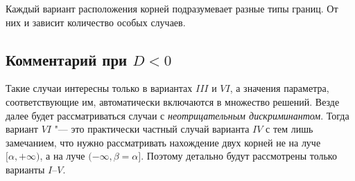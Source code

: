 Каждый вариант расположения корней подразумевает разные типы границ. От них и зависит количество
особых случаев.

\subsection {Комментарий при $D < 0$}

Такие случаи интересны только в вариантах $III$ и $VI$, а значения параметра, соответствующие им,
автоматически включаются в множество решений. Везде далее будет рассматриваться случаи с
\emph{неотрицательным дискриминантом}. Тогда вариант $VI$ "--- это практически частный случай
варианта $IV$ с тем лишь замечанием, что нужно рассматривать нахождение двух корней не на луче
$[\alpha, +\infty)$, а на луче $(-\infty, \beta=\alpha]$. Поэтому детально будут рассмотрены только
варианты $I$--$V$.


